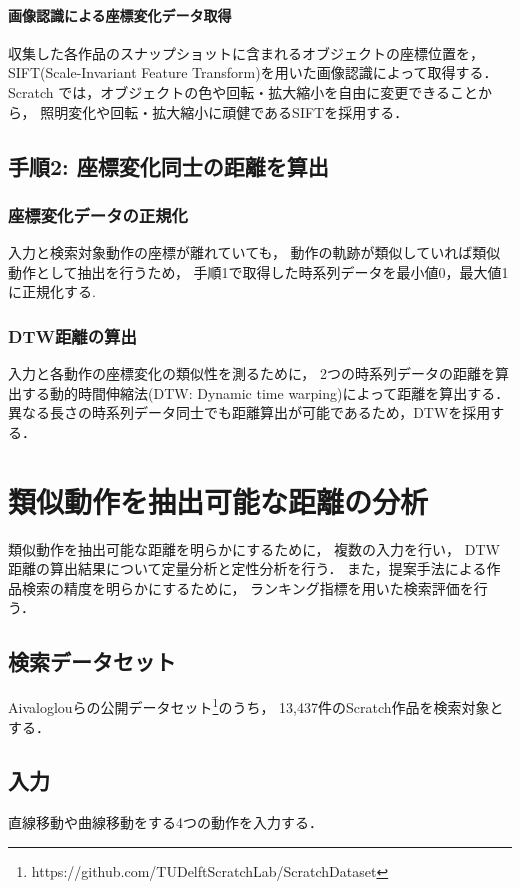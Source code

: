 \documentclass[twocolumn]{jarticle} %
\begin{document}
\paragraph{画像認識による座標変化データ取得}
収集した各作品のスナップショットに含まれるオブジェクトの座標位置を，
SIFT(Scale-Invariant Feature Transform)を用いた画像認識によって取得する．
Scratch では，オブジェクトの色や回転・拡大縮小を自由に変更できることから，
照明変化や回転・拡大縮小に頑健であるSIFTを採用する．

\subsection{手順2: 座標変化同士の距離を算出}
\subsubsection{座標変化データの正規化}
入力と検索対象動作の座標が離れていても，
動作の軌跡が類似していれば類似動作として抽出を行うため，
手順1で取得した時系列データを最小値0，最大値1に正規化する.

\subsubsection{DTW距離の算出}
入力と各動作の座標変化の類似性を測るために，
2つの時系列データの距離を算出する動的時間伸縮法(DTW: Dynamic time warping)によって距離を算出する．
異なる長さの時系列データ同士でも距離算出が可能であるため，DTWを採用する．

\section{類似動作を抽出可能な距離の分析}\label{chap:fig-tab-exp}
類似動作を抽出可能な距離を明らかにするために，
複数の入力を行い，
DTW距離の算出結果について定量分析と定性分析を行う．
また，提案手法による作品検索の精度を明らかにするために，
ランキング指標を用いた検索評価を行う．

\subsection{検索データセット}
Aivaloglouらの公開データセット\footnote{https://github.com/TUDelftScratchLab/ScratchDataset}のうち，
13,437件のScratch作品を検索対象とする．

\subsection{入力}
直線移動や曲線移動をする4つの動作を入力する．
\end{document}

